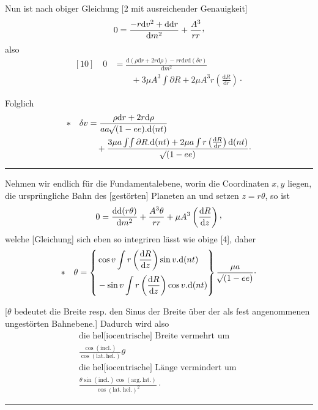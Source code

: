 \par
\noindent\hspace*{\parindent}Nun ist nach obiger Gleichung [2 mit ausreichender Genauigkeit]
\[
0=\frac{-r\mathrm{d}v^{2}+\mathrm{d}\mathrm{d}r}{\mathrm{d}m^{2}}+\frac{A^{3}}{rr}\mathpunct{\text{\raisebox{.45ex}{,}}}
\]
also
\[
\begin{aligned}
[10]\quad 0&=\frac{\mathrm{d}(\rho\mathrm{d}r+2r\mathrm{d}\rho)-rr\mathrm{d}v\mathrm{d}(\delta v)}{\mathrm{d}m^{2}}\\
&\qquad+3\mu A^{3}\int\partial R+2\mu A^{3}r\left(\frac{\mathrm{d}R}{\mathrm{d}r}\right)\mathpunct{\cdot}
\end{aligned}
\]
\par
\noindent\hspace*{\parindent}Folglich
\[
\begin{aligned}
*\quad\delta v&=\frac{\rho\mathrm{d}r+2r\mathrm{d}\rho}{aa\mathord{{}^{}\!\surd}(1-ee)\mathord{.}\mathrm{d}(nt)}\\
&\quad+\frac{3\mu a\int\!\int\partial R\mathord{.}\mathrm{d}(nt)+2\mu a\int r\left(\frac{\mathrm{d}R}{\mathrm{d}r}\right)\mathrm{d}(nt)}{\mathord{{}^{}\!\surd}(1-ee)}\mathpunct{\cdot}
\end{aligned}
\]
\par\medskip
\begin{center}\rule{.27\linewidth}{.4pt}\end{center}
\par
\noindent\hspace*{\parindent}Nehmen wir endlich für die Fundamentalebene, worin die Coordinaten \(x,y\) liegen, die ursprüngliche Bahn des [gestörten] Planeten an und setzen \(z=r\theta\), so ist
\[
0=\frac{\mathrm{d}\mathrm{d}(r\theta)}{\mathrm{d}m^{2}}+\frac{A^{3}\theta}{rr}+\mu A^{3}\left(\frac{\mathrm{d}R}{\mathrm{d}z}\right)\mathpunct{\text{\raisebox{.45ex}{,}}}
\]
welche [Gleichung] sich eben so integriren lässt wie obige [4], daher
\[
*\quad\theta=\left\{\begin{aligned}&\cos v\int r\left(\frac{\mathrm{d}R}{\mathrm{d}z}\right)\sin v\mathord{.}\mathrm{d}(nt)\\[2pt]&-\sin v\int r\left(\frac{\mathrm{d}R}{\mathrm{d}z}\right)\cos v\mathord{.}\mathrm{d}(nt)\end{aligned}\right\}\frac{\mu a}{\mathord{{}^{}\!\surd}(1-ee)}\mathpunct{\cdot}
\]
\par
\noindent\hspace*{\parindent}[\(\theta\) bedeutet die Breite resp. den Sinus der Breite über der als fest angenommenen ungestörten Bahnebene.] Dadurch wird also
\[
\begin{gathered}
\text{die hel[iocentrische] Breite vermehrt um }\\[2pt]
\frac{\cos(\mathrm{incl.})}{\cos(\mathrm{lat.\ hel.})}\theta\\[6pt]
\text{die hel[iocentrische] Länge vermindert um }\\[2pt]
\frac{\theta\sin(\mathrm{incl.})\cos(\mathrm{arg.\ lat.})}{\cos(\mathrm{lat.\ hel.})^{2}}\mathpunct{\cdot}
\end{gathered}
\]
\par\medskip
\begin{center}\rule{.27\linewidth}{.4pt}\end{center}
